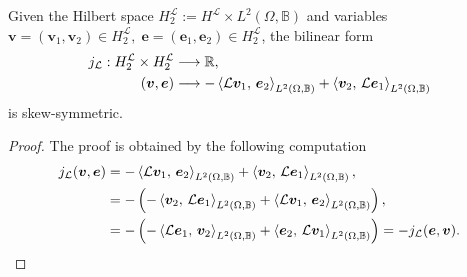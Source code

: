 \begin{proposition}
	Given the Hilbert space $H^{\mathcal{L}}_2 := H^\mathcal{L} \times L^2(\Omega, \mathbb{B})$ and variables $\bm{v} = (\bm{v}_1, \bm{v}_2) \in H^{\mathcal{L}}_2, \; \bm{e} = (\bm{e}_1, \bm{e}_2) \in H^{\mathcal{L}}_2$, the bilinear form 
	\begin{equation*}
	\begin{aligned}
	j_\mathcal{L}: H^{\mathcal{L}}_2 \times H^{\mathcal{L}}_2 &\longrightarrow \mathbb{R}, \\
	(\bm{v}, \bm{e}) &\longrightarrow -\inner[L^2(\Omega, \mathbb{B})]{\mathcal{L}\bm{v}_1}{\bm{e}_2} + \inner[L^2(\Omega, \mathbb{B})]{\bm{v}_2}{\mathcal{L}\bm{e}_1}
	\end{aligned}
	\end{equation*}
	is skew-symmetric.
	\begin{proof}
		The proof is obtained by the following computation
		\begin{equation*}
		\begin{aligned}
		j_\mathcal{L}(\bm{v}, \bm{e}) &= -\inner[L^2(\Omega, \mathbb{B})]{\mathcal{L}\bm{v}_1}{\bm{e}_2} + \inner[L^2(\Omega, \mathbb{B})]{\bm{v}_2}{\mathcal{L}\bm{e}_1}, \\
		&= - \left( - \inner[L^2(\Omega, \mathbb{B})]{\bm{v}_2}{\mathcal{L}\bm{e}_1} + \inner[L^2(\Omega, \mathbb{B})]{\mathcal{L}\bm{v}_1}{\bm{e}_2}\right), \\
		&= - \left( - \inner[L^2(\Omega, \mathbb{B})]{\mathcal{L}\bm{e}_1}{\bm{v}_2} + \inner[L^2(\Omega, \mathbb{B})]{\bm{e}_2}{\mathcal{L}\bm{v}_1}\right) = - j_\mathcal{L}(\bm{e}, \bm{v}).
		\end{aligned}
		\end{equation*}
	\end{proof}
\end{proposition}

